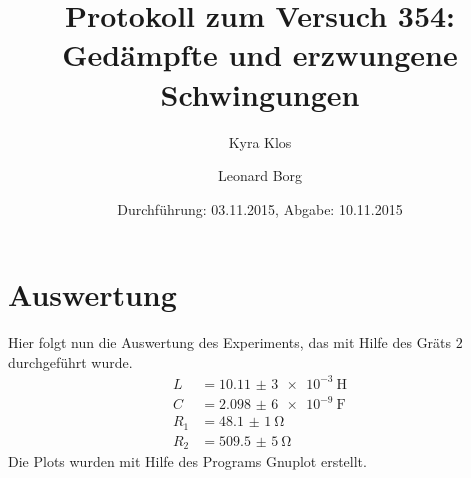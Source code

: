 
\title{Protokoll zum Versuch 354:\\ Gedämpfte und erzwungene Schwingungen}
\author{Kyra Klos \and Leonard Borg}
\date{Durchführung: 03.11.2015, Abgabe: 10.11.2015}

  \maketitle
  \setcounter{tocdepth}{1}
  \tableofcontents
  \newpage
  
  
  
\section{Auswertung}
\label{sec:Auswertung}
Hier folgt nun die Auswertung des Experiments, das mit Hilfe des Gräts $2$ durchgeführt wurde.
\begin{align*}
 L &= \SI{10,11(3)e-3}{\henry}\\
 C &= \SI{2,098(6)e-9}{\farad}\\
 R_1 &= \SI{48,1(1)}{\ohm}\\
 R_2 &= \SI{509,5(5)}{\ohm}
\end{align*}
Die Plots wurden mit Hilfe des Programs Gnuplot erstellt.
